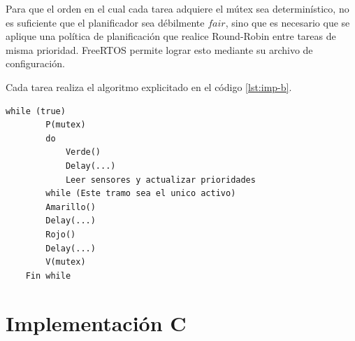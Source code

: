Para que el orden en el cual cada tarea adquiere el mútex sea determinístico, no es suficiente que el planificador sea débilmente $fair$, sino que es necesario que se aplique una política de planificación que realice Round-Robin entre tareas de misma prioridad. FreeRTOS permite lograr esto mediante su archivo de configuración.

Cada tarea realiza el algoritmo explicitado en el código \ref{lst:imp-b}.

\begin{lstlisting}[label=lst:imp-b, caption=Pseudocódigo del programa que corre cada tarea en la implementación B.]
	while (true)
		P(mutex)
		do
			Verde()
			Delay(...)
			Leer sensores y actualizar prioridades
		while (Este tramo sea el unico activo)
		Amarillo()
		Delay(...)
		Rojo()
		Delay(...)
		V(mutex)
	Fin while
\end{lstlisting}

\section{Implementación C}
